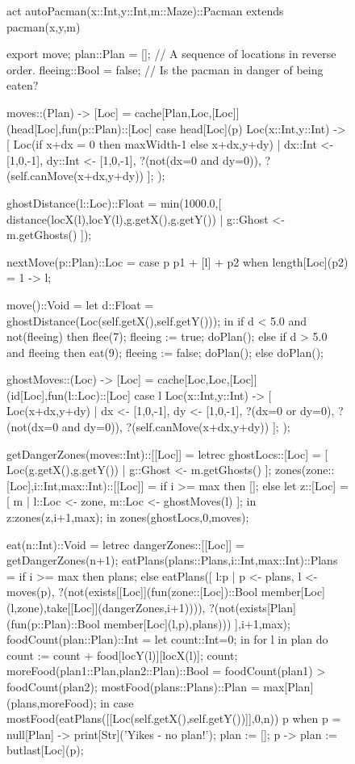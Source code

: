 \documentclass[5p,times]{elsarticle}
\begin{document}
\begin{figure}
\begin{ESL}
act autoPacman(x::Int,y::Int,m::Maze)::Pacman extends pacman(x,y,m) { export move;
  plan::Plan             = [];         // A sequence of locations in reverse order.
  fleeing::Bool          = false;      // Is the pacman in danger of being eaten?
  
  moves::(Plan) -> [Loc] = cache[Plan,Loc,[Loc]](head[Loc],fun(p::Plan)::[Loc] 
    case head[Loc](p) {
      Loc(x::Int,y::Int) ->
        [ Loc(if x+dx = 0 then maxWidth-1 else x+dx,y+dy) |  dx::Int <- [1,0,-1], dy::Int <- [1,0,-1], 
            ?(not(dx=0 and dy=0)), 
            ?(self.canMove(x+dx,y+dy)) ];
    });

  ghostDistance(l::Loc)::Float = min(1000.0,[ distance(locX(l),locY(l),g.getX(),g.getY()) | g::Ghost <- m.getGhosts() ]);

  nextMove(p::Plan)::Loc = case p {  p1 + [l] + p2 when length[Loc](p2) = 1 -> l; }
      
  move()::Void =
    let d::Float = ghostDistance(Loc(self.getX(),self.getY()));
    in if d < 5.0 and not(fleeing) then { flee(7); fleeing := true; doPlan(); } 
       else if d > 5.0 and fleeing then { eat(9); fleeing := false; doPlan(); } 
       else doPlan();

  ghostMoves::(Loc) -> [Loc] = cache[Loc,Loc,[Loc]](id[Loc],fun(l::Loc)::[Loc]
    case l { Loc(x::Int,y::Int) ->
      [ Loc(x+dx,y+dy) | dx <- [1,0,-1], dy <- [1,0,-1], ?(dx=0 or dy=0), ?(not(dx=0 and dy=0)), ?(self.canMove(x+dx,y+dy)) ];
    });

  getDangerZones(moves::Int)::[[Loc]] = 
    letrec ghostLocs::[Loc] = [ Loc(g.getX(),g.getY()) | g::Ghost <- m.getGhosts() ];
           zones(zone::[Loc],i::Int,max::Int)::[[Loc]] =
             if i >= max then []; else let z::[Loc] = [ m  | l::Loc <- zone, m::Loc <- ghostMoves(l) ]; in z:zones(z,i+1,max);
    in zones(ghostLocs,0,moves);

  eat(n::Int)::Void =
    letrec dangerZones::[[Loc]] = getDangerZones(n+1);
           eatPlans(plans::Plans,i::Int,max::Int)::Plans =
             if i >= max then plans;
             else eatPlans([ l:p |  p <- plans, l <- moves(p),
               ?(not(exists[[Loc]](fun(zone::[Loc])::Bool member[Loc](l,zone),take[[Loc]](dangerZones,i+1)))),
               ?(not(exists[Plan](fun(p::Plan)::Bool member[Loc](l,p),plans)))
             ],i+1,max);
       foodCount(plan::Plan)::Int = let count::Int=0; in { for l in plan do count := count + food[locY(l)][locX(l)]; count;}
       moreFood(plan1::Plan,plan2::Plan)::Bool = foodCount(plan1) > foodCount(plan2);
       mostFood(plans::Plans)::Plan = max[Plan](plans,moreFood);
    in case mostFood(eatPlans([[Loc(self.getX(),self.getY())]],0,n)) {
         p when p = null[Plan] -> { print[Str]('Yikes - no plan!'); plan := []; }
         p -> plan := butlast[Loc](p);
       }

}
\end{ESL}
\end{figure}
\end{document}
